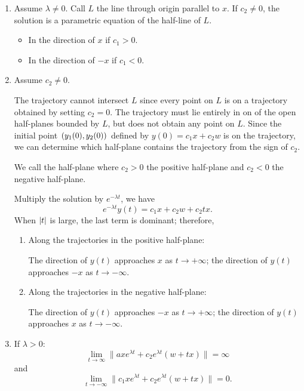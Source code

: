 \documentclass[12pt, a4paper]{article}
\begin{document}
\begin{itemize}
	\begin{enumerate}
		\item Assume $\lambda\neq0$. Call $L$ the line through origin parallel to $x$. If $c_2\neq0$, the solution is a parametric equation of the half-line of $L$. 
		\begin{itemize}
			\item In the direction of $x$ if $c_1>0$.
			\item In the direction of $-x$ if $c_1<0$.
		\end{itemize}
		\item Assume $c_2\neq0$.\par 
		The trajectory cannot intersect $L$ since every point on $L$ is on a trajectory obtained by setting $c_2=0$. The trajectory must lie entirely in on of the open half-planes bounded by $L$, but does not obtain any point on $L$. Since the initial point $\qty(y_1(0),y_2(0))$ defined by $y(0)=c_1x+c_2w$ is on the trajectory, we can determine which half-plane contains the trajectory from the sign of $c_2$.\par 
		We call the half-plane where $c_2>0$ the positive half-plane and $c_2<0$ the negative half-plane. \par 
		Multiply the solution by $e^{-\lambda t}$, we have \[e^{-\lambda t}y(t)=c_1x+c_2w+c_2tx.\] When $\qty|t|$ is large, the last term is dominant; therefore, 
		\begin{enumerate}
			\item Along the trajectories in the positive half-plane: \par 
			The direction of $y(t)$ approaches $x$ as $t\to+\infty$; the direction of $y(t)$ approaches $-x$ as $t\to-\infty$.
			\item Along the trajectories in the negative half-plane:\par 
			The direction of $y(t)$ approaches $-x$ as $t\to+\infty$; the direction of $y(t)$ approaches $x$ as $t\to-\infty$.
		\end{enumerate}
		\item If $\lambda>0$: \[\lim_{t\to\infty}\|axe^{\lambda t}+c_2e^{\lambda t}(w+tx)\|=\infty\] and \[\lim_{t\to-\infty}\|c_1xe^{\lambda t}+c_2e^{\lambda t}(w+tx)\|=0.\]
		\begin{figure}[H]
			\centering

\end{figure}
\end{enumerate}
\end{itemize}
\end{document}

